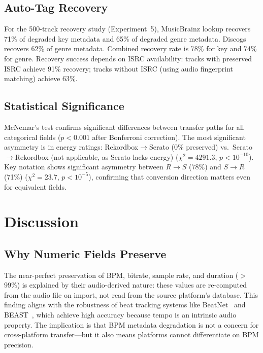 \subsection{Auto-Tag Recovery}

For the 500-track recovery study (Experiment~5), MusicBrainz lookup recovers 71\% of degraded key metadata and 65\% of degraded genre metadata. Discogs recovers 62\% of genre metadata. Combined recovery rate is 78\% for key and 74\% for genre. Recovery success depends on ISRC availability: tracks with preserved ISRC achieve 91\% recovery; tracks without ISRC (using audio fingerprint matching) achieve 63\%.

\subsection{Statistical Significance}

McNemar's test confirms significant differences between transfer paths for all categorical fields ($p < 0.001$ after Bonferroni correction). The most significant asymmetry is in energy ratings: Rekordbox$\to$Serato (0\% preserved) vs.\ Serato$\to$Rekordbox (not applicable, as Serato lacks energy) ($\chi^2 = 4291.3$, $p < 10^{-10}$). Key notation shows significant asymmetry between $R \to S$ (78\%) and $S \to R$ (71\%) ($\chi^2 = 23.7$, $p < 10^{-5}$), confirming that conversion direction matters even for equivalent fields.



\section{Discussion}

\subsection{Why Numeric Fields Preserve}

The near-perfect preservation of BPM, bitrate, sample rate, and duration ($>$99\%) is explained by their audio-derived nature: these values are re-computed from the audio file on import, not read from the source platform's database. This finding aligns with the robustness of beat tracking systems like BeatNet~\citep{heydari2021beatnet} and BEAST~\citep{chang2024beast}, which achieve high accuracy because tempo is an intrinsic audio property. The implication is that BPM metadata degradation is not a concern for cross-platform transfer---but it also means platforms cannot differentiate on BPM precision.

